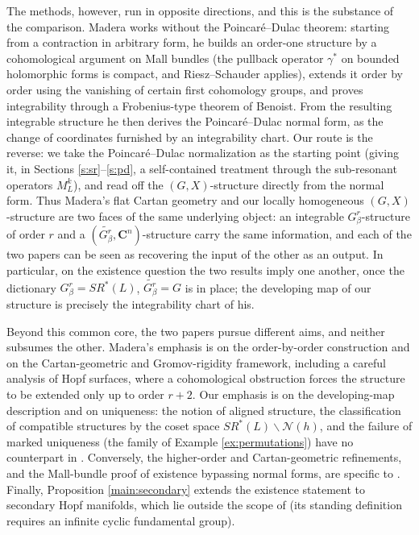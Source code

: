 \documentclass[english,11pt]{amsart}
\theoremstyle{definition}
\theoremstyle{remark}
\numberwithin{equation}{section}
\newcommand{\C}{\mathbf{C}}
\newcommand{\Norm}{\mathcal{N}}
\begin{document}
The methods, however, run in opposite directions, and this is the substance of the comparison. Madera works without the Poincar\'e--Dulac theorem: starting from a contraction in arbitrary form, he builds an order-one structure by a cohomological argument on Mall bundles (the pullback operator $\gamma^*$ on bounded holomorphic forms is compact, and Riesz--Schauder applies), extends it order by order using the vanishing of certain first cohomology groups, and proves integrability through a Frobenius-type theorem of Benoist. From the resulting integrable structure he then derives the Poincar\'e--Dulac normal form, as the change of coordinates furnished by an integrability chart. Our route is the reverse: we take the Poincar\'e--Dulac normalization as the starting point (giving it, in Sections \ref{s:sr}--\ref{s:pd}, a self-contained treatment through the sub-resonant operators $M^k_L$), and read off the $(G,X)$-structure directly from the normal form. Thus Madera's flat Cartan geometry and our locally homogeneous $(G,X)$-structure are two faces of the same underlying object: an integrable $G^r_\beta$-structure of order $r$ and a $(\widetilde{G^r_\beta},\C^n)$-structure carry the same information, and each of the two papers can be seen as recovering the input of the other as an output. In particular, on the existence question the two results imply one another, once the dictionary $G^r_\beta=SR^*(L)$, $\widetilde{G^r_\beta}=G$ is in place; the developing map of our structure is precisely the integrability chart of his.

Beyond this common core, the two papers pursue different aims, and neither subsumes the other. Madera's emphasis is on the order-by-order construction and on the Cartan-geometric and Gromov-rigidity framework, including a careful analysis of Hopf surfaces, where a cohomological obstruction forces the structure to be extended only up to order $r+2$. Our emphasis is on the developing-map description and on uniqueness: the notion of aligned structure, the classification of compatible structures by the coset space $SR^*(L)\backslash\Norm(h)$, and the failure of marked uniqueness (the family of Example \ref{ex:permutations}) have no counterpart in \cite{Madera}. Conversely, the higher-order and Cartan-geometric refinements, and the Mall-bundle proof of existence bypassing normal forms, are specific to \cite{Madera}. Finally, Proposition \ref{main:secondary} extends the existence statement to secondary Hopf manifolds, which lie outside the scope of \cite{Madera} (its standing definition requires an infinite cyclic fundamental group).
\end{document}
